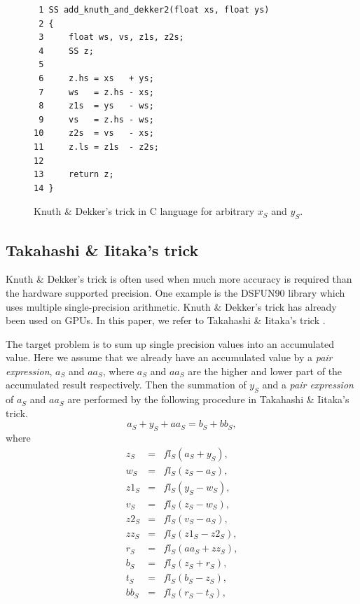 \begin{figure}
\begin{center}\footnotesize
\begin{minipage}{100mm}\def\baselinestretch{0.8}
\begin{verbatim}
 1 SS add_knuth_and_dekker2(float xs, float ys)
 2 {
 3     float ws, vs, z1s, z2s;
 4     SS z;
 5 
 6     z.hs = xs   + ys;
 7     ws   = z.hs - xs;
 8     z1s  = ys   - ws;
 9     vs   = z.hs - ws;
10     z2s  = vs   - xs;
11     z.ls = z1s  - z2s;
12 
13     return z;
14 }
\end{verbatim}\def\baselinestretch{1.0}
\end{minipage}
\caption{Knuth \& Dekker's trick in C language for arbitrary $x_S$ and $y_S$.}
\label{fig:KaD2}
\end{center}
\end{figure}

\subsection{Takahashi \& Iitaka's trick}

Knuth \& Dekker's trick is often used when much more accuracy is
required than the hardware supported precision. One example is the
DSFUN90 library \cite{highprecisionlib} which uses multiple
single-precision arithmetic.  Knuth \& Dekker's trick has already been
used on GPUs.  In this paper, we refer to Takahashi \& Iitaka's trick
\cite{Takahashi1, Takahashi2}.

The target problem is to sum up single precision values into
an accumulated value. Here we assume that 
we already have an accumulated value
by a {\it pair expression}, $a_S$ and $aa_S$, where $a_S$ and $aa_S$
are the higher and lower part of the accumulated result respectively.
Then the summation of $y_S$ and a {\it pair expression} of $a_S$ and $aa_S$
are performed by the following procedure in Takahashi \& 
Iitaka's trick.
\begin{equation}
a_S + y_S + aa_S = b_S + bb_S,
\end{equation}
where
\begin{eqnarray}
z_S  &=& fl_S( a_S + y_S ),\nonumber \\
w_S  &=& fl_S( z_S - a_S ),\nonumber \\
z1_S &=& fl_S( y_S - w_S ),\nonumber \\
v_S  &=& fl_S( z_S - w_S ),\nonumber \\
z2_S &=& fl_S( v_S - a_S ),\nonumber \\
zz_S &=& fl_S( z1_S - z2_S ),\label{eqn:TaI}\\
r_S  &=& fl_S( aa_S + zz_S ),\nonumber \\
b_S  &=& fl_S( z_S  + r_S  ),\nonumber \\
t_S  &=& fl_S( b_S  - z_S  ),\nonumber \\
bb_S &=& fl_S( r_S  - t_S  ),\nonumber 
\end{eqnarray}
%

